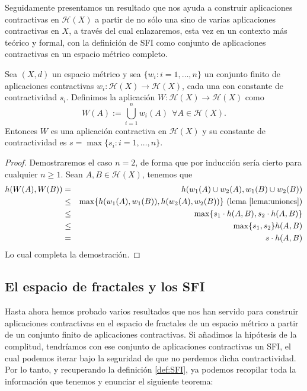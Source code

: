 Seguidamente presentamos un resultado que nos ayuda a construir aplicaciones contractivas en $\mathcal{H}(X)$ a partir de no sólo una sino de varias aplicaciones contractivas en $X$, a través del cual enlazaremos, esta vez en un contexto más teórico y formal, con la definición de SFI como conjunto de aplicaciones contractivas en un espacio métrico completo.

\begin{proposicion}
    Sea $(X,d)$ un espacio métrico y sea $\{w_i:i=1,\dots,n\}$ un conjunto finito de aplicaciones contractivas $w_i:\mathcal{H}(X)\longrightarrow\mathcal{H}(X)$, cada una con constante de contractividad $s_i$. Definimos la aplicación $W:\mathcal{H}(X)\longrightarrow\mathcal{H}(X)$ como
    \begin{equation}
        \label{eqn:W}
        W(A) := \bigcup_{i=1}^n w_i(A) \ \ \forall A\in\mathcal{H}(X).
    \end{equation}
    Entonces $W$ es una aplicación contractiva en $\mathcal{H}(X)$ y su constante de contractividad es $s=\max\{s_i:i=1,\dots,n\}$.
\end{proposicion}
\begin{proof}
    Demostraremos el caso $n=2$, de forma que por inducción sería cierto para cualquier $n\geq 1$. Sean $A,B\in\mathcal{H}(X)$, tenemos que
    \begin{eqnarray*}
    h(W(A),W(B)) & = & h(w_1(A)\cup w_2(A), w_1(B)\cup w_2(B)) \\
                 & \leq & \max\{h(w_1(A),w_1(B)), h(w_2(A),w_2(B))\}\text{ (lema \ref{lema:uniones})} \\
                 & \leq & \max\{s_1\cdot h(A,B), s_2\cdot h(A,B) \} \\
                 & \leq & \max\{s_1,s_2\} h(A,B) \\
                 & = & s \cdot h(A,B)
    \end{eqnarray*}
    Lo cual completa la demostración.
\end{proof}

\subsection{El espacio de fractales y los SFI}

Hasta ahora hemos probado varios resultados que nos han servido para construir aplicaciones contractivas en el espacio de fractales de un espacio métrico a partir de un conjunto finito de aplicaciones contractivas. Si añadimos la hipótesis de la complitud, tendríamos con ese conjunto de aplicaciones contractivas un SFI, el cual podemos iterar bajo la seguridad de que no perdemos dicha contractividad. Por lo tanto, y recuperando la definición \ref{def:SFI}, ya podemos recopilar toda la información que tenemos y enunciar el siguiente teorema:

